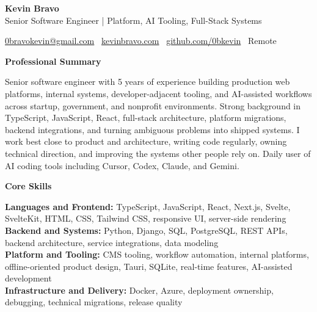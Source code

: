 \documentclass[11pt]{article}
\begin{document}
\begin{center}
    {\LARGE \textbf{Kevin Bravo}}\\
    Senior Software Engineer | Platform, AI Tooling, Full-Stack Systems \\
    \hrulefill
\end{center}

\begin{center}
    \href{mailto:0bravokevin@gmail.com}{0bravokevin@gmail.com}
    \textbullet\
    \href{https://kevinbravo.com}{kevinbravo.com}
    \textbullet\
    \href{https://github.com/0bkevin}{github.com/0bkevin}
    \textbullet\
Remote
\end{center}

\vspace{4pt}
\begin{center}
    \textbf{Professional Summary}
\end{center}
\vspace{-4pt}
Senior software engineer with 5 years of experience building production web platforms, internal systems, developer-adjacent tooling, and AI-assisted workflows across startup, government, and nonprofit environments. Strong background in TypeScript, JavaScript, React, full-stack architecture, platform migrations, backend integrations, and turning ambiguous problems into shipped systems. I work best close to product and architecture, writing code regularly, owning technical direction, and improving the systems other people rely on. Daily user of AI coding tools including Cursor, Codex, Claude, and Gemini.

\vspace{6pt}
\begin{center}
    \textbf{Core Skills}
\end{center}
\vspace{-4pt}
\textbf{Languages and Frontend:} TypeScript, JavaScript, React, Next.js, Svelte, SvelteKit, HTML, CSS, Tailwind CSS, responsive UI, server-side rendering \\
\textbf{Backend and Systems:} Python, Django, SQL, PostgreSQL, REST APIs, backend architecture, service integrations, data modeling \\
\textbf{Platform and Tooling:} CMS tooling, workflow automation, internal platforms, offline-oriented product design, Tauri, SQLite, real-time features, AI-assisted development \\
\textbf{Infrastructure and Delivery:} Docker, Azure, deployment ownership, debugging, technical migrations, release quality
\end{document}
